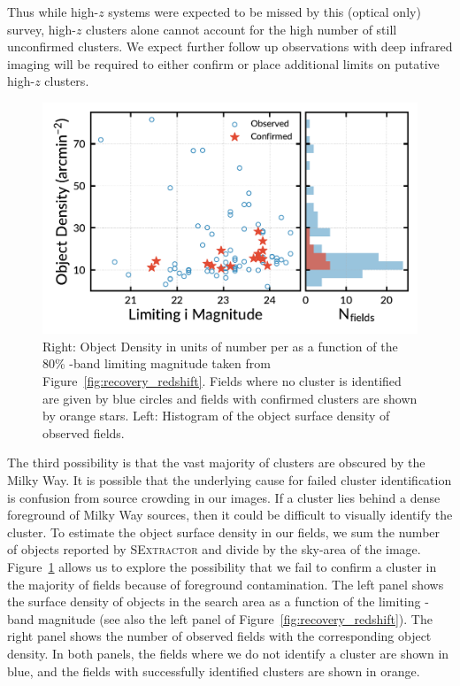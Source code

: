 \documentclass[apj, revtex4-1]{emulateapj}
\begin{document}
Thus while high-$z$ systems were expected to be missed by this (optical only) survey, high-$z$ clusters alone cannot account for the high number of still unconfirmed clusters. We expect further follow up observations with deep infrared imaging will be required to either confirm or place additional limits on putative high-$z$ clusters.

\begin{figure}
	\includegraphics[width=\columnwidth]{figures/N_vs_density.pdf}
	\caption{Right: Object Density in units of number per \arcminsq as a function of the 80\% \sdssi-band limiting magnitude taken from Figure~\ref{fig:recovery_redshift}. Fields where no cluster is identified are given by blue circles and fields with confirmed clusters are shown by orange stars. Left: Histogram of the object surface density of observed fields.}
	\label{fig:N_vs_density}
\end{figure}

The third possibility is that the vast majority of clusters are obscured by the Milky Way. It is possible that the underlying cause for failed cluster identification is confusion from source crowding in our images. If a cluster lies behind a dense foreground of Milky Way sources, then it could be difficult to visually identify the cluster. To estimate the object surface density in our fields, we sum the number of objects reported by \textsc{SExtractor} and divide by the sky-area of the image. Figure~\ref{fig:N_vs_density} allows us to explore the possibility that we fail to confirm a cluster in the majority of fields because of foreground contamination. The left panel shows the surface density of objects in the search area as a function of the limiting \sdssi-band magnitude (see also the left panel of Figure~\ref{fig:recovery_redshift}). The right panel shows the number of observed fields with the corresponding object density. In both panels, the fields where we do not identify a cluster are shown in blue, and the fields with successfully identified clusters are shown in orange.
\end{document}
